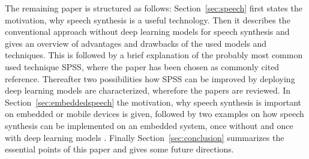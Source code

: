 The remaining paper is structured as follows: Section~\ref{sec:speech} first states the motivation, why speech synthesis is a useful technology. Then it describes the conventional approach without deep learning models for speech synthesis and gives an overview of advantages and drawbacks of the used models and techniques. This is followed by a brief explanation of the probably most common used technique \ac{SPSS}, where the paper \cite{zen:statistical} has been chosen as commonly cited reference. Thereafter two possibilities how \ac{SPSS} can be improved by deploying deep learning models are characterized, wherefore the papers \cite{zen:deepstatistical, hashimoto:effect} are reviewed. In Section~\ref{sec:embeddedspeech} the motivation, why speech synthesis is important on embedded or mobile devices is given, followed by two examples on how speech synthesis can be implemented on an embedded system, once without \cite{toth:optimizing} and once with deep learning models \cite{boros:robust}. Finally Section~\ref{sec:conclusion} summarizes the essential points of this paper and gives some future directions.